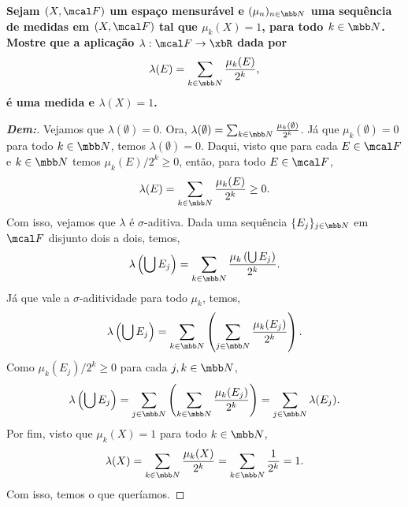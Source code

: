 \biglinend
\newpage 
{}
\myexe{\thedois}
\bigline 
\textbf{
  Sejam $(X, \mcal F)$ um espaço mensurável e $(\mu_n)_{n \in \mbb N}$ uma sequência 
  de medidas em $(X, \mcal F)$ tal que $\mu_k(X) = 1$, para todo $k \in \mbb N$. 
  Mostre que a aplicação $\lambda: \mcal F \rightarrow \xbR$ dada por 
\begin{align*}
  \lambda(E) = \sum_{k \in \mbb N} \frac{\mu_k(E)}{2^k},
\end{align*}
é uma medida e $\lambda(X) = 1$.
}
\begin{proof}[\textbf{Dem:}] Vejamos que $\lambda(\emptyset) = 0$. 
Ora, $\lambda(\emptyset) = \sum_{k \in \mbb N} \frac{\mu_k(\emptyset)}{2^k}$. Já que 
  $\mu_k(\emptyset) = 0$ para todo $k \in \mbb N$, temos $\lambda(\emptyset) = 0$.
  Daqui, visto que para cada $E \in \mcal F$ e $k \in \mbb N$ temos $\mu_k(E)/2^k \ge 0$, 
então, para todo $E \in \mcal F$,
  \begin{align*}
    \lambda(E) = \sum_{k \in \mbb N} \frac{\mu_k(E)}{2^k} \ge 0.
  \end{align*}
  Com isso, vejamos que $\lambda$ é $\sigma$-aditiva. Dada uma sequência 
  $\{E_j\}_{j \in \mbb N}$ em $\mcal F$ disjunto dois a dois, temos, 
  \begin{align*}
    \lambda\left(\bigcup E_j\right) = 
    \sum_{k \in \mbb N} \frac{\mu_k \left(\bigcup E_j\right)}{2^k}.
  \end{align*}
  Já que vale a $\sigma$-aditividade para todo $\mu_k$, temos,
  \begin{align*}
    \lambda\left(\bigcup E_j\right) = 
    \sum_{k \in \mbb N}\left(\sum_{j \in \mbb N} \frac{\mu_k (E_j)}{2^k} \right).
  \end{align*}
  Como $\mu_k(E_j)/2^k \ge 0$ para cada $j,k \in \mbb N$,
 \begin{align*}
    \lambda\left(\bigcup E_j\right) = 
    \sum_{j \in \mbb N}\left(\sum_{k \in \mbb N} \frac{\mu_k (E_j)}{2^k} \right) = 
    \sum_{j \in \mbb N}\lambda(E_j).
  \end{align*}
 Por fim, visto que $\mu_k(X) = 1$ para todo $k \in \mbb N$, 
\begin{align*}
  \lambda(X) = \sum_{k \in \mbb N} \frac{\mu_k(X)}{2^k} 
  = \sum_{k \in \mbb N} \frac{1}{2^k} = 1. 
\end{align*}
Com isso, temos o que queríamos.
\end{proof}

